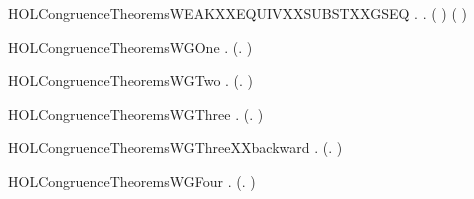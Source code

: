 \newcommand{\HOLCongruenceTheoremsWEAKXXEQUIVXXSUBSTXXGCONTEXT}{\UseVerbatim{HOLCongruenceTheoremsWEAKXXEQUIVXXSUBSTXXGCONTEXT}}
\begin{SaveVerbatim}{HOLCongruenceTheoremsWEAKXXEQUIVXXSUBSTXXGSEQ}
\HOLTokenTurnstile{} \HOLSymConst{\HOLTokenForall{}} .    \HOLSymConst{\HOLTokenImp{}} \HOLSymConst{\HOLTokenForall{}}.   \HOLSymConst{\HOLTokenImp{}}  ( ) ( )
\end{SaveVerbatim}
\newcommand{\HOLCongruenceTheoremsWEAKXXEQUIVXXSUBSTXXGSEQ}{\UseVerbatim{HOLCongruenceTheoremsWEAKXXEQUIVXXSUBSTXXGSEQ}}
\begin{SaveVerbatim}{HOLCongruenceTheoremsWGOne}
\HOLTokenTurnstile{} \HOLSymConst{\HOLTokenForall{}}.  (\HOLTokenLambda{}. )
\end{SaveVerbatim}
\newcommand{\HOLCongruenceTheoremsWGOne}{\UseVerbatim{HOLCongruenceTheoremsWGOne}}
\begin{SaveVerbatim}{HOLCongruenceTheoremsWGTwo}
\HOLTokenTurnstile{} \HOLSymConst{\HOLTokenForall{}}.  (\HOLTokenLambda{}. )
\end{SaveVerbatim}
\newcommand{\HOLCongruenceTheoremsWGTwo}{\UseVerbatim{HOLCongruenceTheoremsWGTwo}}
\begin{SaveVerbatim}{HOLCongruenceTheoremsWGThree}
\HOLTokenTurnstile{} \HOLSymConst{\HOLTokenForall{}} .   \HOLSymConst{\HOLTokenImp{}}  (\HOLTokenLambda{}.  )
\end{SaveVerbatim}
\newcommand{\HOLCongruenceTheoremsWGThree}{\UseVerbatim{HOLCongruenceTheoremsWGThree}}
\begin{SaveVerbatim}{HOLCongruenceTheoremsWGThreeXXbackward}
\HOLTokenTurnstile{} \HOLSymConst{\HOLTokenForall{}} .  (\HOLTokenLambda{}.  ) \HOLSymConst{\HOLTokenImp{}}  
\end{SaveVerbatim}
\newcommand{\HOLCongruenceTheoremsWGThreeXXbackward}{\UseVerbatim{HOLCongruenceTheoremsWGThreeXXbackward}}
\begin{SaveVerbatim}{HOLCongruenceTheoremsWGFour}
\HOLTokenTurnstile{} \HOLSymConst{\HOLTokenForall{}} .   \HOLSymConst{\HOLTokenConj{}}   \HOLSymConst{\HOLTokenImp{}}  (\HOLTokenLambda{}.   \HOLSymConst{\ensuremath{+}}  )
\end{SaveVerbatim}

